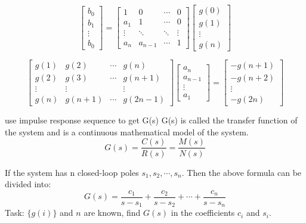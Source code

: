 \begin{frame}
$$
\begin{bmatrix}
b_0 \\
b_1 \\
\vdots \\
b_0 
\end{bmatrix}
=
\begin{bmatrix}
1 & 0 & \cdots & 0 \\
a_1 & 1 & \cdots & 0 \\
\vdots & \ddots & \ddots & \vdots \\
a_n & a_{n-1} & \cdots & 1
\end{bmatrix}
\begin{bmatrix}
g(0) \\
g(1) \\
\vdots \\
g(n)
\end{bmatrix}
$$

$$
\begin{bmatrix}
g(1) & g(2) & \cdots & g(n)  \\
g(2) & g(3) & \cdots & g(n+1) \\
\vdots & \vdots &  & \vdots \\
g(n) & g(n+1) & \cdots & g(2n-1)
\end{bmatrix}
\begin{bmatrix}
a_n \\
a_{n-1} \\
\vdots \\
a_1
\end{bmatrix}
=
\begin{bmatrix}
-g(n+1) \\
-g(n+2) \\
\vdots  \\
-g(2n)
\end{bmatrix}
$$
\end{frame}

\begin{frame}{use impulse response sequence to get G(s)}
G(s) is called the transfer function of the system and is a continuous mathematical model of the system.
$$
G(s)=\frac{C(s)}{R(s)}=\frac{M(s)}{N(s)}
$$

If the system has n closed-loop poles $s_1, s_2, \cdots, s_n$.
Then the above formula can be divided into:
$$
G(s)=\frac{c_1}{s-s_1}+\frac{c_2}{s-s_2}+\cdots+\frac{c_n}{s-s_n}
$$
Task: $\{g(i)\}$ and $n$ are known, find $G(s)$ in the coefficients $c_i$ and $s_i$.
\end{frame}

